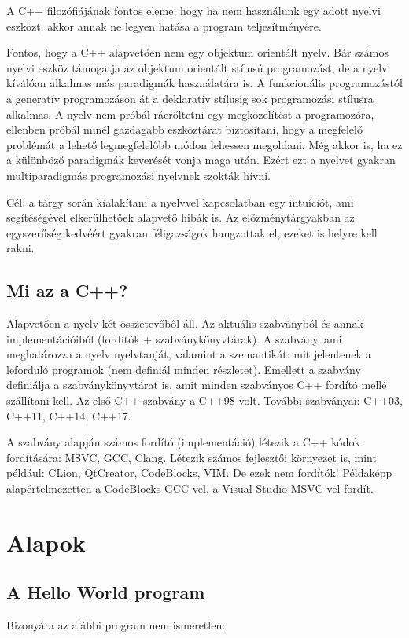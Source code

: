 \documentclass[a4paper,11.5pt,table]{article}
\begin{document}
	A C++ filozófiájának fontos eleme, hogy ha nem használunk egy adott nyelvi eszközt, akkor annak ne legyen hatása a program teljesítményére.
	
	Fontos, hogy a C++ alapvetően nem egy objektum orientált nyelv. Bár számos nyelvi eszköz támogatja az objektum orientált stílusú programozást, de a nyelv kíválóan alkalmas más paradigmák használatára is. A funkcionális programozástól a generatív programozáson át a deklaratív stílusig sok programozási stílusra alkalmas. A nyelv nem próbál ráerőltetni egy megközelítést a programozóra, ellenben próbál minél gazdagabb eszköztárat biztosítani, hogy a megfelelő problémát a lehető legmegfelelőbb módon lehessen megoldani. Még akkor is, ha ez a különböző paradigmák keverését vonja maga után. Ezért ezt a nyelvet gyakran multiparadigmás programozási nyelvnek szokták hívni. 

	\medskip
	Cél: a tárgy során kialakítani a nyelvvel kapcsolatban egy intuíciót, ami segítéségével elkerülhetőek alapvető hibák is. Az előzménytárgyakban az egyszerűség kedvéért gyakran féligazságok hangzottak el, ezeket is helyre kell rakni.
	\subsection{Mi az a C++?}
	Alapvetően a nyelv két összetevőből áll. Az aktuális szabványból és annak implementációiból (fordítók + szabványkönyvtárak). A szabvány, ami meghatározza a nyelv nyelvtanját, valamint a szemantikát: mit jelentenek a leforduló programok (nem definiál minden részletet). Emellett a szabvány definiálja a szabványkönyvtárat is, amit minden szabványos C++ fordító mellé szállítani kell. Az első C++ szabvány a {C++98} volt. További szabványai: {C++03}, {C++11}, {C++14}, {C++17}.
	
	\medskip
	A szabvány alapján számos fordító (implementáció) létezik a C++ kódok fordítására: MSVC, GCC, Clang.
	Létezik számos fejlesztői környezet is, mint például: CLion, QtCreator, CodeBlocks, VIM. De ezek nem fordítók! Példaképp alapértelmezetten a CodeBlocks GCC-vel, a Visual Studio MSVC-vel fordít.
	\section{Alapok}

	\subsection{A Hello World program}
	Bizonyára az alábbi program nem ismeretlen:
	
\end{document}

